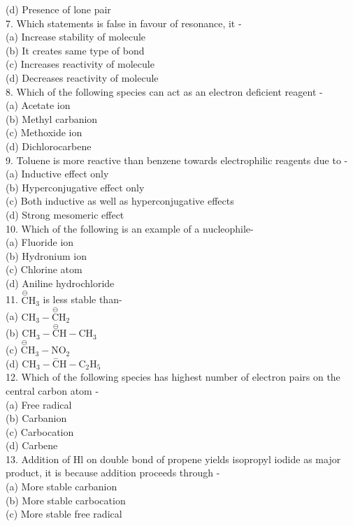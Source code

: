 \documentclass[10pt]{article}
\begin{document}
(d) Presence of lone pair\\
7. Which statements is false in favour of resonance, it -\\
(a) Increase stability of molecule\\
(b) It creates same type of bond\\
(c) Increases reactivity of molecule\\
(d) Decreases reactivity of molecule\\
8. Which of the following species can act as an electron deficient reagent -\\
(a) Acetate ion\\
(b) Methyl carbanion\\
(c) Methoxide ion\\
(d) Dichlorocarbene\\
9. Toluene is more reactive than benzene towards electrophilic reagents due to -\\
(a) Inductive effect only\\
(b) Hyperconjugative effect only\\
(c) Both inductive as well as hyperconjugative effects\\
(d) Strong mesomeric effect\\
10. Which of the following is an example of a nucleophile-\\
(a) Fluoride ion\\
(b) Hydronium ion\\
(c) Chlorine atom\\
(d) Aniline hydrochloride\\
11. $\stackrel{\ominus}{\mathrm{C}} \mathrm{H}_{3}$ is less stable than-\\
(a) $\mathrm{CH}_{3}-\stackrel{\ominus}{\mathrm{C}} \mathrm{H}_{2}$\\
(b) $\mathrm{CH}_{3}-\stackrel{\ominus}{\mathrm{C}} \mathrm{H}-\mathrm{CH}_{3}$\\
(c) $\stackrel{\ominus}{\mathrm{C}} \mathrm{H}_{3}-\mathrm{NO}_{2}$\\
(d) $\mathrm{CH}_{3}-\stackrel{-}{\mathrm{C}} \mathrm{H}-\mathrm{C}_{2} \mathrm{H}_{5}$\\
12. Which of the following species has highest number of electron pairs on the central carbon atom -\\
(a) Free radical\\
(b) Carbanion\\
(c) Carbocation\\
(d) Carbene\\
13. Addition of Hl on double bond of propene yields isopropyl iodide as major product, it is because addition proceeds through -\\
(a) More stable carbanion\\
(b) More stable carbocation\\
(c) More stable free radical
\end{document}
